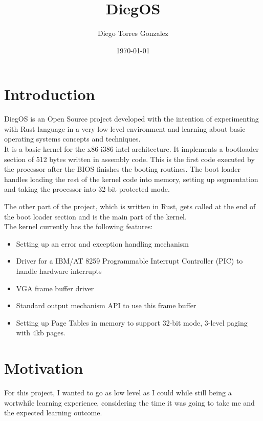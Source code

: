 \documentclass[12pt]{article}
\begin{document}
\title{DiegOS}
\author{Diego Torres Gonzalez}
\date{\today}

\maketitle

\section*{Introduction}

DiegOS is an Open Source project developed with the intention of experimenting
with Rust language in a very low level environment and learning about basic operating
systems concepts and techniques. \\

It is a basic kernel for the x86-i386 intel architecture. It implements a bootloader
section of 512 bytes written in assembly code. This is the first code executed by the processor after the
BIOS finishes the booting routines. The boot loader handles loading the rest of the kernel code
into memory, setting up segmentation and taking the processor into 32-bit protected mode.

The other part of the project, which is written in Rust, gets called at the end of the boot loader section
and is the main part of the kernel.  \\

\noindent
The kernel currently has the following features:

\begin{itemize}
	\item
		Setting up an error and exception handling mechanism
	\item
		Driver for a IBM/AT 8259 Programmable Interrupt Controller (PIC) to handle hardware interrupts
	\item
		VGA frame buffer driver
	\item
		Standard output mechanism API to use this frame buffer
	\item
		Setting up Page Tables in memory to support 32-bit mode, 3-level paging with 4kb pages.
\end{itemize}

\section*{Motivation}

For this project, I wanted to go as low level as I could while still being a wortwhile learning experience,
considering the time it was going to take me and the expected learning outcome.
\end{document}
